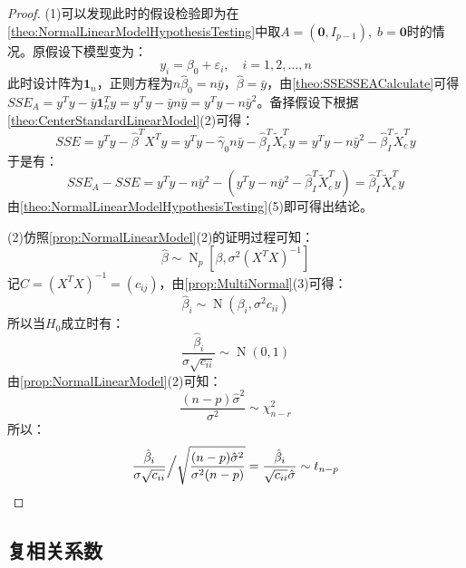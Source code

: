\begin{proof}
	(1)可以发现此时的假设检验即为在\cref{theo:NormalLinearModelHypothesisTesting}中取$A=(\mathbf{0},I_{p-1}),\;b=\mathbf{0}$时的情况。原假设下模型变为：
	\begin{equation*}
		y_i=\beta_0+\varepsilon_i,\quad i=1,2,\dots,n
	\end{equation*}
	此时设计阵为$\mathbf{1}_n$，正则方程为$n\hat{\beta}_0=n\bar{y}$，$\hat{\beta}=\bar{y}$，由\cref{theo:SSESSEACalculate}可得$SSE_A=y^Ty-\bar{y}\mathbf{1}_n^Ty=y^Ty-\bar{y}n\bar{y}=y^Ty-n\bar{y}^2$。备择假设下根据\cref{theo:CenterStandardLinearModel}(2)可得：
	\begin{equation*}
		SSE=y^Ty-\hat{\beta}^TX^Ty=y^Ty-\hat{\gamma}_0n\bar{y}-\hat{\beta}_I^T\tilde{X}_c^Ty=y^Ty-n\bar{y}^2-\hat{\beta}_I^T\tilde{X}_c^Ty
	\end{equation*}
	于是有：
	\begin{equation*}
		SSE_A-SSE=y^Ty-n\bar{y}^2-(y^Ty-n\bar{y}^2-\hat{\beta}_I^T\tilde{X}_c^Ty)=\hat{\beta}_I^T\tilde{X}_c^Ty
	\end{equation*}
	由\cref{theo:NormalLinearModelHypothesisTesting}(5)即可得出结论。\par
	(2)仿照\cref{prop:NormalLinearModel}(2)的证明过程可知：
	\begin{equation*}
		\hat{\beta}\sim\operatorname{N}_p[\beta,\sigma^2(X^TX)^{-1}]
	\end{equation*}
	记$C=(X^TX)^{-1}=(c_{ij})$，由\cref{prop:MultiNormal}(3)可得：
	\begin{equation*}
		\hat{\beta}_i\sim\operatorname{N}(\beta_i,\sigma^2c_{ii})
	\end{equation*}
	所以当$H_0$成立时有：
	\begin{equation*}
		\frac{\hat{\beta}_i}{\sigma\sqrt{c_{ii}}}\sim\operatorname{N}(0,1)
	\end{equation*}
	由\cref{prop:NormalLinearModel}(2)可知：
	\begin{equation*}
		\frac{(n-p)\hat{\sigma}^2}{\sigma^2}\sim\chi_{n-r}^2
	\end{equation*}
	所以：
	\begin{equation*}
		\frac{\hat{\beta}_i}{\sigma\sqrt{c_{ii}}}\Big/\sqrt{\frac{(n-p)\hat{\sigma}^2}{\sigma^2(n-p)}}=\frac{\hat{\beta}_i}{\sqrt{c_{ii}}\hat{\sigma}}\sim t_{n-p}\qedhere
	\end{equation*}
\end{proof}

\subsection{复相关系数}

